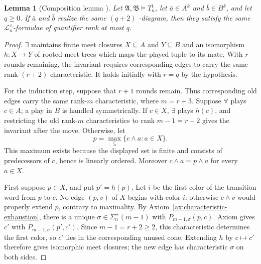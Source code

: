 \documentclass{amsart}
\newtheorem{lemma}{Lemma}
\theoremstyle{definition}
\begin{document}
\begin{lemma}[Composition lemma \MakeUppercase{}]\label{lem:composition1}
    Let $\mathfrak A,\mathfrak B\models T_n^1$, let $\bar a\in A^k$ and $\bar b\in B^k$, and let $q\geq 0$. If $\bar a$ and $\bar b$ realize the same $(q+2)$ \MakeUppercase{}-diagram, then they satisfy the same $\mathcal L_n^\wedge$-formulae of quantifier rank at most $q$.
\end{lemma}
\begin{proof}
    $\exists$ maintains finite meet closures $X\subseteq A$ and $Y\subseteq B$ and an isomorphism $h:X\to Y$ of rooted meet-trees which maps the played tuple to its mate. With $r$ rounds remaining, the invariant requires corresponding edges to carry the same rank-$(r+2)$ characteristic. It holds initially with $r=q$ by the hypothesis.

    For the induction step, suppose that $r+1$ rounds remain. Thus corresponding old edges carry the same rank-$m$ characteristic, where $m=r+3$. Suppose $\forall$ plays $c\in A$; a play in $B$ is handled symmetrically. If $c\in X$, $\exists$ plays $h(c)$, and restricting the old rank-$m$ characteristics to rank $m-1=r+2$ gives the invariant after the move. Otherwise, let
    $$p=\max_{\subseteq}\{c\wedge a:a\in X\}.$$
    This maximum exists because the displayed set is finite and consists of predecessors of $c$, hence is linearly ordered. Moreover $c\wedge a=p\wedge a$ for every $a\in X$.

    First suppose $p\in X$, and put $p'=h(p)$. Let $i$ be the first color of the transition word from $p$ to $c$. No edge $(p,v)$ of $X$ begins with color $i$: otherwise $c\wedge v$ would properly extend $p$, contrary to maximality. By Axiom~\ref{ax:characteristic-exhaustion}, there is a unique $\sigma\in\Sigma_n^{+}(m-1)$ with $P_{m-1,\sigma}(p,c)$. Axiom \MakeUppercase{} gives $c'$ with $P_{m-1,\sigma}(p',c')$. Since $m-1=r+2\geq2$, this characteristic determines the first color, so $c'$ lies in the corresponding unused cone.  Extending $h$ by $c\mapsto c'$ therefore gives isomorphic meet closures; the new edge has characteristic $\sigma$ on both sides.


\end{proof}
\end{document}
